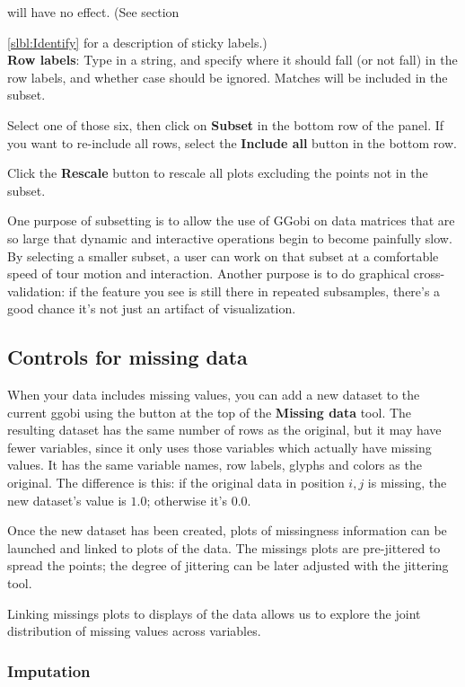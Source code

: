 \documentclass[11pt]{article}
\def\Widget#1{\textbf{#1}}
\begin{document}
  will have no effect. (See section {\ref{slbl:Identify} for a description
  of sticky labels.)
\\\Widget{Row labels}: Type in a string, and specify where it should
  fall (or not fall) in the row labels, and whether case should
  be ignored.  Matches will be included in the subset.

Select one of those six, then click on \Widget{Subset} in the
bottom row of the panel.  If you want to re-include all rows, 
select the \Widget{Include all} button in the bottom row.

Click the \Widget{Rescale} button to rescale all plots excluding
the points not in the subset.

One purpose of subsetting is to allow the use of GGobi on data matrices
that are so large that dynamic and interactive operations begin to
become painfully slow.  By selecting a smaller subset, a user can
work on that subset at a comfortable speed of tour motion and
interaction.  Another purpose is to do graphical cross-validation:
if the feature you see is still there in repeated subsamples, there's
a good chance it's not just an artifact of visualization.

\subsection{Controls for missing data}

When your data includes missing values, you can add a new dataset to
the current ggobi using the button at the top of the \Widget{Missing
data} tool.  The resulting dataset has the same number of rows as the
original, but it may have fewer variables, since it only uses those
variables which actually have missing values.  It has the same
variable names, row labels, glyphs and colors as the original.  The
difference is this: if the original data in position $i,j$ is missing,
the new dataset's value is $1.0$; otherwise it's $0.0$.

Once the new dataset has been created, plots of missingness information
can be launched and linked to plots of the data.  The missings plots
are pre-jittered to spread the points; the degree of jittering can
be later adjusted with the jittering tool.

Linking missings plots to displays of the data allows us to explore the
joint distribution of missing values across variables.

\subsubsection{Imputation}

}
\end{document}
